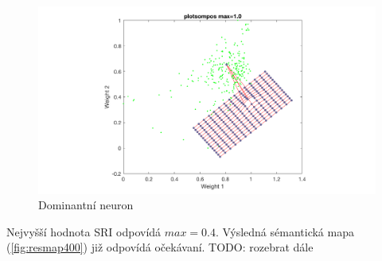 \documentclass[thesis=M,czech]{FITthesis}[2012/06/26]
\begin{document}
\begin{figure}[htbp]
\begin{center}
	\includegraphics[scale=0.2]{plotsompos1000.png}
\caption{Dominantní neuron}
\label{fig:plotsompos1000}
\end{center}
\end{figure}


Nejvyšší hodnota SRI odpovídá $max=0.4$. Výsledná sémantická mapa (\ref{fig:resmap400}) již odpovídá očekávaní. TODO: rozebrat dále 
\end{document}
